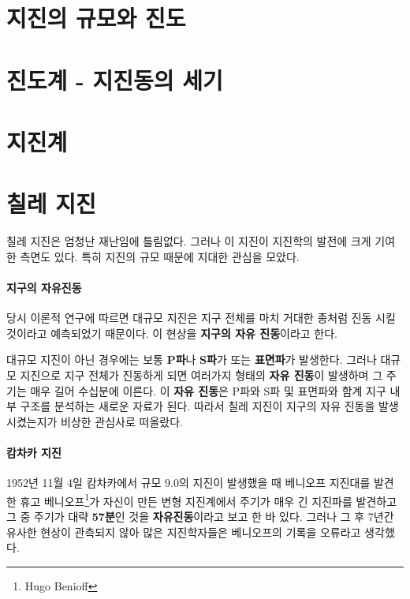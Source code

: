 \documentclass[12pt, a4paper, oneside]{book}
\begin{document}
	\section{지진의 규모와 진도}
	
	
	
	
	
	
	
	
	
	
	
	
	\clearpage
	\section{진도계 - 지진동의 세기}
	
	
	\clearpage
	\section{지진계}
	
	
	\clearpage
	\section{칠레 지진}
	
	칠레 지진은 엄청난 재난임에 틀림없다.
	그러나 이 지진이 지진학의 발전에 크게 기여한 측면도 있다.
	특히 지진의 규모 때문에 지대한 관심을 모았다.\\
	
	\paragraph{지구의 자유진동}
	당시 이론적 연구에 따르면 대규모 지진은 지구 전체를 마치 거대한 종처럼 진동 시킬 것이라고 예측되었기 때문이다.
	이 현상을 \textbf{지구의 자유 진동}이라고 한다.
	
	대규모 지진이 아닌 경우에는 보통 \textbf{P파}나 \textbf{S파}가 또는 \textbf{표면파}가 발생한다.
	그러나 대규모 지진으로 지구 전체가 진동하게 되면 여러가지 형태의 \textbf{자유 진동}이 발생하며 
	그 주기는 매우 길어 수십분에 이른다. 
	이 \textbf{자유 진동}은 P파와 S파 및 표면파와 함계 지구 내부 구조를 분석하는 새로운 자료가 된다.
	따라서 칠레 지진이 지구의 자유 진동을 발생시켰는지가 비상한 관심사로 떠올랐다.
	
	\paragraph{캄차카 지진}
	1952년 11월 4일 캄차카에서 규모 9.0의 지진이 발생했을 때 베니오프 지진대를 발견한 휴고 베니오프\footnote{Hugo Benioff}가 자신이 만든 변형 지진계에서 주기가 매우 긴 지진파를 발견하고 그 중 주기가 대략 \textbf{57분}인 것을 \textbf{자유진동}이라고 보고 한 바 있다.
	그러나 그 후 7년간 유사한 현상이 관측되지 않아 많은 지진학자들은 베니오프의 기록을 오류라고 생각했다.
	
\end{document}
